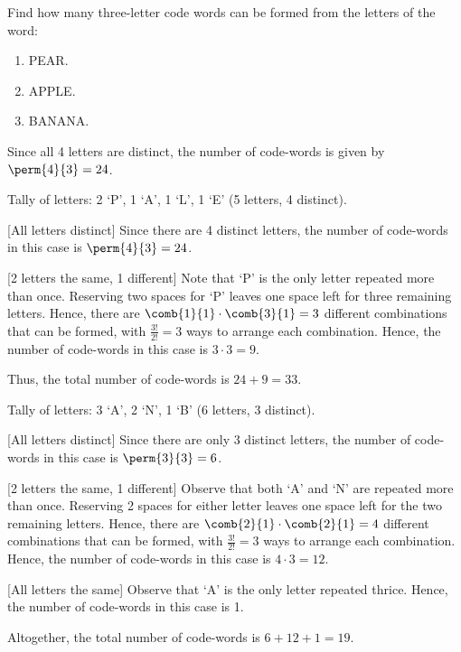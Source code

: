 \begin{problem}
    Find how many three-letter code words can be formed from the letters of the word:
    \begin{enumerate}
        \item PEAR.
        \item APPLE.
        \item BANANA.
    \end{enumerate}
\end{problem}
\begin{solution}
    \begin{ppart}
        Since all 4 letters are distinct, the number of code-words is given by $\perm{4}{3} = 24$.
    \end{ppart}
    \begin{ppart}
        Tally of letters: 2 `P', 1 `A', 1 `L', 1 `E' (5 letters, 4 distinct).

        [All letters distinct] Since there are 4 distinct letters, the number of code-words in this case is $\perm{4}{3} = 24$.

        [2 letters the same, 1 different] Note that `P' is the only letter repeated more than once. Reserving two spaces for `P' leaves one space left for three remaining letters. Hence, there are $\comb{1}{1} \cdot \comb{3}{1} = 3$ different combinations that can be formed, with $\frac{3!}{2!} = 3$ ways to arrange each combination. Hence, the number of code-words in this case is $3 \cdot 3 = 9$.

        Thus, the total number of code-words is $24 + 9 = 33$.
    \end{ppart}
    \begin{ppart}
        Tally of letters: 3 `A', 2 `N', 1 `B' (6 letters, 3 distinct).

        [All letters distinct] Since there are only 3 distinct letters, the number of code-words in this case is $\perm{3}{3} = 6$.

        [2 letters the same, 1 different] Observe that both `A' and `N' are repeated more than once. Reserving 2 spaces for either letter leaves one space left for the two remaining letters. Hence, there are $\comb{2}{1} \cdot \comb{2}{1} = 4$ different combinations that can be formed, with $\frac{3!}{2!} = 3$ ways to arrange each combination. Hence, the number of code-words in this case is $4 \cdot 3 = 12$.

        [All letters the same] Observe that `A' is the only letter repeated thrice. Hence, the number of code-words in this case is 1.

        Altogether, the total number of code-words is $6 + 12 + 1 = 19$.
    \end{ppart}
\end{solution}

